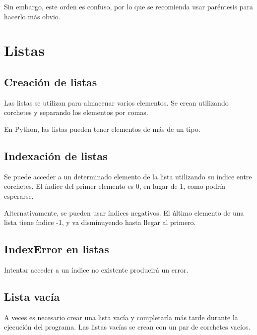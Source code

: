 \documentclass{report}
\begin{document}
{Sin embargo, este orden es confuso, por lo que se recomienda usar paréntesis para hacerlo más obvio.


\clearpage\chapter{Listas}

\section{Creación de listas}

Las listas se utilizan para almacenar varios elementos. Se crean utilizando corchetes y separando los elementos por comas.


En Python, las listas pueden tener elementos de más de un tipo.


\section{Indexación de listas}

Se puede acceder a un determinado elemento de la lista utilizando su índice entre corchetes. El índice del primer elemento es 0, en lugar de 1, como podría esperarse.


Alternativamente, se pueden usar índices negativos. El último elemento de una lista tiene índice -1, y va disminuyendo hasta llegar al primero.


\section{IndexError en listas}

Intentar acceder a un índice no existente producirá un error.


\section{Lista vacía}

A veces es necesario crear una lista vacía y completarla más tarde durante la ejecución del programa. Las listas vacías se crean con un par de corchetes vacíos.

}
\end{document}
